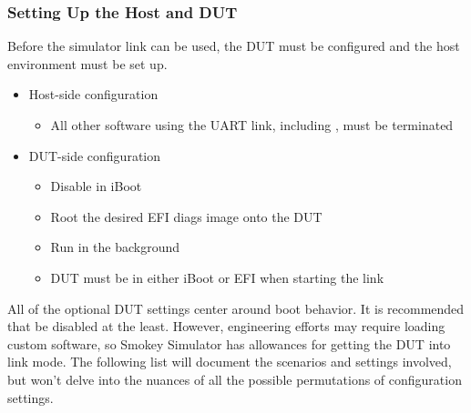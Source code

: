 \subsubsection{Setting Up the Host and DUT}
\label{subsubsec:Setup}

Before the simulator link can be used, the DUT must be configured and the host
environment must be set up.

\begin{itemize}

\item Host-side configuration

	\begin{itemize}

	\item All other software using the UART link, including
	, must be terminated

	\end{itemize}

\item DUT-side configuration

	\begin{itemize}

	\item Disable  in iBoot \optional

	\item Root the desired EFI diags image onto the DUT \optional

	\item Run  in the background \optional

	\item DUT must be in either iBoot or EFI when starting the link

	\end{itemize}

\end{itemize}

All of the optional DUT settings center around boot behavior.  It is
recommended that  be disabled at the least.  However,
engineering efforts may require loading custom software, so Smokey Simulator
has allowances for getting the DUT into link mode.  The following list will
document the scenarios and settings involved, but won't delve into the nuances
of all the possible permutations of configuration settings.

